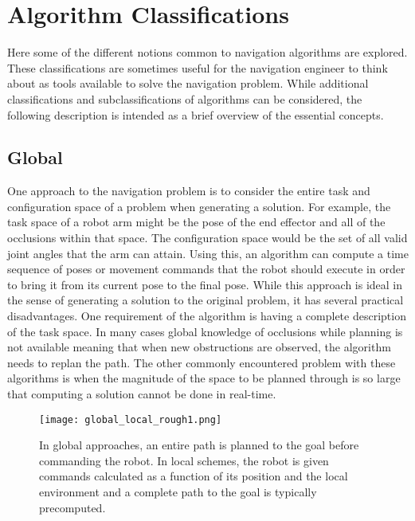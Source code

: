 \section{Algorithm Classifications}
Here some of the different notions common to navigation algorithms are explored. These classifications are sometimes useful
for the navigation engineer to think about as tools available to solve the navigation problem. While additional classifications
and subclassifications of algorithms can be considered, the following description is intended as a brief overview of the 
essential concepts.

\subsection{Global}
One approach to the navigation problem is to consider the entire task and configuration space of a problem when generating
a solution. For example, the task space of a robot arm might be the pose of the end effector and all of the occlusions
within that space. The configuration space would be the set of all valid joint angles that the arm can attain. Using this,
an algorithm can compute a time sequence of poses or movement commands that the robot should execute in order to bring it
from its current pose to the final pose. While this approach is ideal in the sense of generating a solution to the 
original problem, it has several practical disadvantages. One requirement of the algorithm is having a complete description 
of the task space. In many cases global knowledge of occlusions while planning is not available meaning that when new
obstructions are observed, the algorithm needs to replan the path. The other commonly encountered problem with these
algorithms is when the magnitude of the space to be planned through is so large that computing a solution cannot be done
in real-time.
\begin{figure}
	\centering
	\texttt{[image: global\_local\_rough1.png]}
	\caption
	{In global approaches, an entire path is planned to the goal before commanding the robot. In local 
	schemes, the robot is given commands calculated as a function of its position and the local environment and
	a complete path to the goal is typically precomputed. }
	\label{fig:global_vs_local1}
\end{figure}

